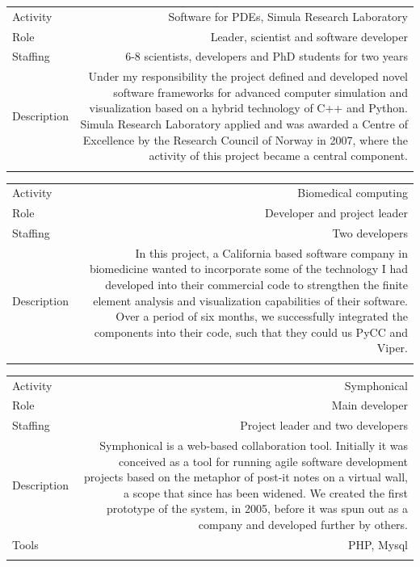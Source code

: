 \documentclass[english,a4paper,11pt]{article}
\begin{document}
\begin{tabular}{@{}LR}
Activity & Software for PDEs, Simula Research Laboratory\\
Role & Leader, scientist and software developer\\
Staffing & 6-8 scientists, developers and PhD students for two years\\
Description & Under my responsibility the project defined and developed novel software frameworks for advanced computer simulation and visualization based on a hybrid technology of C++ and Python. Simula Research Laboratory applied and was awarded a Centre of Excellence by the Research Council of Norway in 2007, where the activity of this project became a central component.\\ 
\addlinespace \bottomrule[.1pt] \addlinespace
   \end{tabular}

\begin{tabular}{@{}LR}
Activity & Biomedical computing\\
Role & Developer and project leader\\
Staffing & Two developers\\
Description & In this project, a California based software company in biomedicine wanted to incorporate some of the technology I had developed into their commercial code to strengthen the finite element analysis and visualization capabilities of their software. Over a period of six months, we successfully integrated the components into their code, such that they could us PyCC and Viper.\\ 
\addlinespace \bottomrule[.1pt] \addlinespace
   \end{tabular}

\begin{tabular}{@{}LR}
Activity & Symphonical \\
Role & Main developer \\
Staffing & Project leader and two developers \\
Description & Symphonical is a web-based collaboration tool. Initially it was conceived as a tool for running agile software development projects based on the metaphor of post-it notes on a virtual wall, a scope that since has been widened. We created the first prototype of the system, in 2005, before it was spun out as a company and developed further by others. \\
Tools & PHP, Mysql \\
\addlinespace \bottomrule[.1pt] \addlinespace
   \end{tabular}
\end{document}
